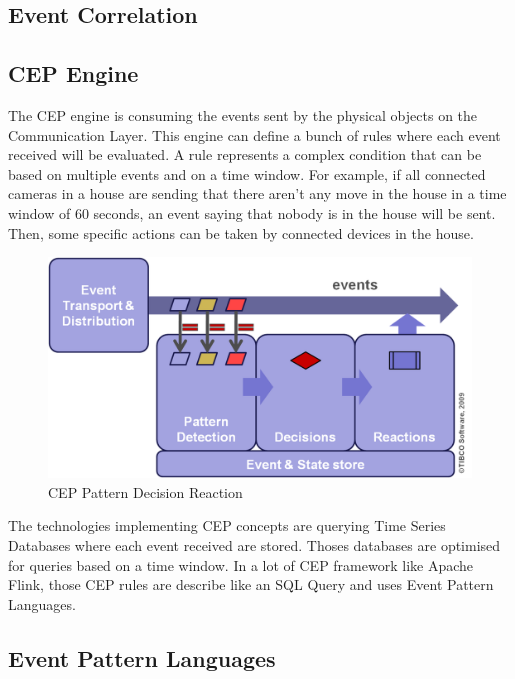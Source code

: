 \documentclass[11pt]{article}
\begin{document}
\subsection{Event Correlation}

\subsection{CEP Engine}

The CEP engine is consuming the events sent by the physical objects on the Communication Layer. This engine can define a bunch of rules where each event received will be evaluated. A rule represents a complex condition that can be based on multiple events and on a time window. For example, if all connected cameras in a house are sending that there aren't any move in the house in a time window of 60 seconds, an event saying that nobody is in the house will be sent. Then, some specific actions can be taken by connected devices in the house. 
\newline
\begin{figure}[h]
	\includegraphics[scale=0.6]{assets/cep-pattern-decision-reaction.png} 
	\caption{CEP Pattern Decision Reaction}
	\label{fig:cep-pattern-decision-reaction}
\end{figure}

The technologies implementing CEP concepts are querying Time Series Databases where each event received are stored. Thoses databases are optimised for queries based on a time window. In a lot of CEP framework like Apache Flink, those CEP rules are describe like an SQL Query and uses Event Pattern Languages. 

\subsection{Event Pattern Languages}
\end{document}
